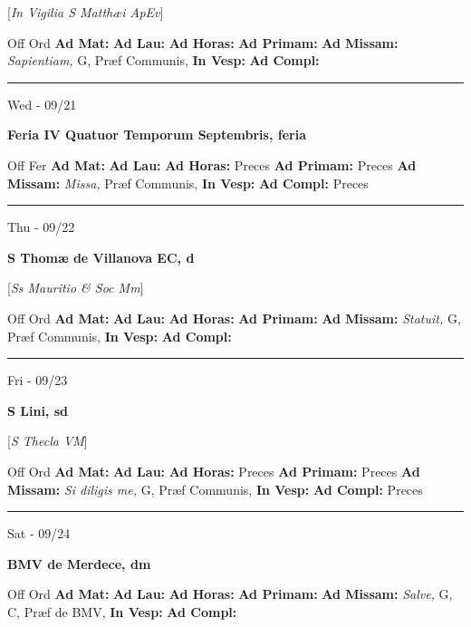 \documentclass[letterpaper, 10pt]{article}
\begin{document}
[\textit{In Vigilia S Matthæi ApEv}]
\begin{justify}
Off Ord
\textbf{Ad Mat: }
\textbf{Ad Lau: }
\textbf{Ad Horas: }
\textbf{Ad Primam: }
\textbf{Ad Missam:} \textit{Sapientiam, } G, Præf Communis, 
\textbf{In Vesp: }
\textbf{Ad Compl: }\end{justify}



\hrule
\begin{center}
Wed - 09/21
\end{center}\textbf{ \large Feria IV Quatuor Temporum Septembris, \textnormal{\normalsize feria}}
\begin{justify}
Off Fer
\textbf{Ad Mat: }
\textbf{Ad Lau: }
\textbf{Ad Horas: }Preces
\textbf{Ad Primam: }Preces
\textbf{Ad Missam:} \textit{Missa, } Præf Communis, 
\textbf{In Vesp: }
\textbf{Ad Compl: }Preces\end{justify}



\hrule
\begin{center}
Thu - 09/22
\end{center}\textbf{ \large S Thomæ de Villanova EC, \textnormal{\normalsize d}}

[\textit{Ss Mauritio \& Soc Mm}]
\begin{justify}
Off Ord
\textbf{Ad Mat: }
\textbf{Ad Lau: }
\textbf{Ad Horas: }
\textbf{Ad Primam: }
\textbf{Ad Missam:} \textit{Statuit, } G, Præf Communis, 
\textbf{In Vesp: }
\textbf{Ad Compl: }\end{justify}



\hrule
\begin{center}
Fri - 09/23
\end{center}\textbf{ \large S Lini, \textnormal{\normalsize sd}}

[\textit{S Thecla VM}]
\begin{justify}
Off Ord
\textbf{Ad Mat: }
\textbf{Ad Lau: }
\textbf{Ad Horas: }Preces
\textbf{Ad Primam: }Preces
\textbf{Ad Missam:} \textit{Si diligis me, } G, Præf Communis, 
\textbf{In Vesp: }
\textbf{Ad Compl: }Preces\end{justify}



\hrule
\begin{center}
Sat - 09/24
\end{center}\textbf{ \large BMV de Merdece, \textnormal{\normalsize dm}}
\begin{justify}
Off Ord
\textbf{Ad Mat: }
\textbf{Ad Lau: }
\textbf{Ad Horas: }
\textbf{Ad Primam: }
\textbf{Ad Missam:} \textit{Salve, } G, C, Præf de BMV, 
\textbf{In Vesp: }
\textbf{Ad Compl: }\end{justify}
\end{document}
